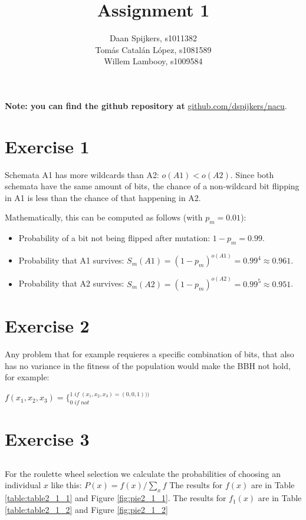 \documentclass{scrartcl}
\title{Assignment 1}
\author{Daan Spijkers, s1011382\\ Tomás Catalán López, s1081589\\ Willem Lambooy, s1009584}
\begin{document}
\maketitle

\textbf{Note: you can find the github repository at}
\url{github.com/dspijkers/nacu}.

\section{Exercise 1}
Schemata A1 has more wildcards than A2: $o(A1) < o(A2)$. Since both schemata have the same amount of bits, the chance of a non-wildcard bit flipping in A1 is less than the chance of that happening in A2.

Mathematically, this can be computed as follows (with $p_m=0.01$):
\begin{itemize}
 \item Probability of a bit not being flipped after mutation: $1-p_m=0.99$.
 \item Probability that A1 survives: $S_m(A1)=(1-p_m)^{o(A1)}=0.99^4\approx0.961$.
 \item Probability that A2 survives: $S_m(A2)=(1-p_m)^{o(A2)}=0.99^5\approx0.951$.
\end{itemize}

\section{Exercise 2}
Any problem that for example requieres a specific combination of bits, that also has no variance in the fitness of the population would make the BBH not hold, for example:\\
\begin{center}
$\displaystyle f(x_1,x_2,x_3)=\mathrm{ \{ }
_{0 \; if \; not}
^{1\;if \; (x_1,x_2,x_3)=(0,0,1)))}$
\end{center}

\section{Exercise 3}
\subsection{}
For the roulette wheel selection we calculate the probabilities of choosing an individual $x$ like this: $P(x) = f(x)/\sum_{x}f$
\newline
The results for $f(x)$ are in Table \ref{table:table2_1_1} and Figure \ref{fig:pie2_1_1}. The results for $f_1(x)$ are in Table \ref{table:table2_1_2} and Figure \ref{fig:pie2_1_2}
\end{document}
